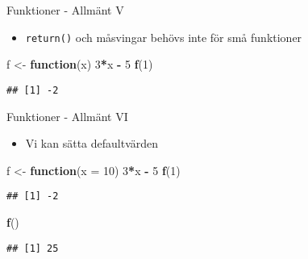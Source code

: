 \documentclass[
  11pt,
  ignorenonframetext,
]{beamer}
\newenvironment{Shaded}{\begin{snugshade}}{\end{snugshade}}
\newcommand{\AttributeTok}[1]{\textcolor[rgb]{0.13,0.29,0.53}{#1}}
\newcommand{\ControlFlowTok}[1]{\textcolor[rgb]{0.13,0.29,0.53}{\textbf{#1}}}
\newcommand{\DecValTok}[1]{\textcolor[rgb]{0.00,0.00,0.81}{#1}}
\newcommand{\FunctionTok}[1]{\textcolor[rgb]{0.13,0.29,0.53}{\textbf{#1}}}
\newcommand{\NormalTok}[1]{#1}
\newcommand{\OtherTok}[1]{\textcolor[rgb]{0.56,0.35,0.01}{#1}}
\newcommand{\SpecialCharTok}[1]{\textcolor[rgb]{0.81,0.36,0.00}{\textbf{#1}}}
\providecommand{\tightlist}{%
  \setlength{\itemsep}{0pt}\setlength{\parskip}{0pt}}
\begin{document}
\begin{frame}[fragile]{Funktioner - Allmänt V}
\label{funktioner---allmuxe4nt-v}
\begin{itemize}
\tightlist
\item
  \texttt{return()} och måsvingar behövs inte för små funktioner
\end{itemize}

\begin{Shaded}
\begin{Highlighting}[]
\NormalTok{f }\OtherTok{\textless{}{-}} \ControlFlowTok{function}\NormalTok{(x) }\DecValTok{3}\SpecialCharTok{*}\NormalTok{x }\SpecialCharTok{{-}} \DecValTok{5}
\FunctionTok{f}\NormalTok{(}\DecValTok{1}\NormalTok{)}
\end{Highlighting}
\end{Shaded}

\begin{verbatim}
## [1] -2
\end{verbatim}
\end{frame}

\begin{frame}[fragile]{Funktioner - Allmänt VI}
\label{funktioner---allmuxe4nt-vi}
\begin{itemize}
\tightlist
\item
  Vi kan sätta defaultvärden
\end{itemize}

\begin{Shaded}
\begin{Highlighting}[]
\NormalTok{f }\OtherTok{\textless{}{-}} \ControlFlowTok{function}\NormalTok{(}\AttributeTok{x =} \DecValTok{10}\NormalTok{) }\DecValTok{3}\SpecialCharTok{*}\NormalTok{x }\SpecialCharTok{{-}} \DecValTok{5}
\FunctionTok{f}\NormalTok{(}\DecValTok{1}\NormalTok{)}
\end{Highlighting}
\end{Shaded}

\begin{verbatim}
## [1] -2
\end{verbatim}

\begin{Shaded}
\begin{Highlighting}[]
\FunctionTok{f}\NormalTok{()}
\end{Highlighting}
\end{Shaded}

\begin{verbatim}
## [1] 25
\end{verbatim}
\end{frame}
\end{document}
